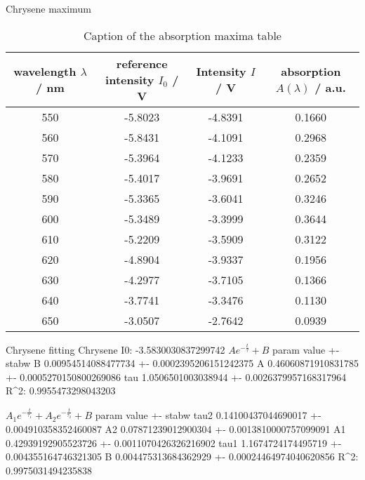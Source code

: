 Chrysene maximum
\begin{table}[H]
\centering
\caption{Caption of the absorption maxima table}
\label{tab:Chrysene_maximum}
\begin{tabular}{cccc}
\toprule
wavelength $\lambda$ / nm & reference intensity $I_0$ / V & Intensity $I$ / V & absorption $A(\lambda)$ / a.u. \\
\midrule
\midrule
550 & -5.8023 & -4.8391 & 0.1660 \\
560 & -5.8431 & -4.1091 & 0.2968 \\
570 & -5.3964 & -4.1233 & 0.2359 \\
580 & -5.4017 & -3.9691 & 0.2652 \\
590 & -5.3365 & -3.6041 & 0.3246 \\
600 & -5.3489 & -3.3999 & 0.3644 \\
610 & -5.2209 & -3.5909 & 0.3122 \\
620 & -4.8904 & -3.9337 & 0.1956 \\
630 & -4.2977 & -3.7105 & 0.1366 \\
640 & -3.7741 & -3.3476 & 0.1130 \\
650 & -3.0507 & -2.7642 & 0.0939 \\
\bottomrule
\end{tabular}
\end{table}


Chrysene fitting
Chrysene I0:  -3.5830030837299742
$A e^{- \frac{t}{\tau}} + B$
param value               +- stabw                 
B     0.00954514088477734 +- 0.0002395206151242375 
A     0.46060871910831785 +- 0.0005270150800269086 
tau   1.0506501003038944  +- 0.0026379957168317964 
R^2: 0.9955473298043203

$A_{1} e^{- \frac{t}{\tau_{1}}} + A_{2} e^{- \frac{t}{\tau_{2}}} + B$
param value                +- stabw                  
tau2  0.14100437044690017  +- 0.004910358352460087   
A2    0.07871239012900304  +- 0.0013810000757099091  
A1    0.42939192905523726  +- 0.0011070426326216902  
tau1  1.1674724174495719   +- 0.004355164746321305   
B     0.004475313684362929 +- 0.00024464974040620856 
R^2: 0.9975031494235838

